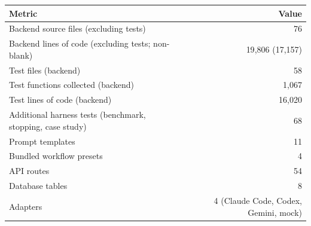 \documentclass[10pt,letterpaper]{article}
\begin{document}
\begin{tabular}{@{}lr@{}}
\hline
Metric & Value \\ \hline
Backend source files (excluding tests) & 76 \\
Backend lines of code (excluding tests; non-blank) & 19{,}806 (17{,}157) \\
Test files (backend) & 58 \\
Test functions collected (backend) & 1{,}067 \\
Test lines of code (backend) & 16{,}020 \\
Additional harness tests (benchmark, stopping, case study) & 68 \\
Prompt templates & 11 \\
Bundled workflow presets & 4 \\
API routes & 54 \\
Database tables & 8 \\
Adapters & 4 (Claude Code, Codex, Gemini, mock) \\ \hline
\end{tabular}
\end{document}
